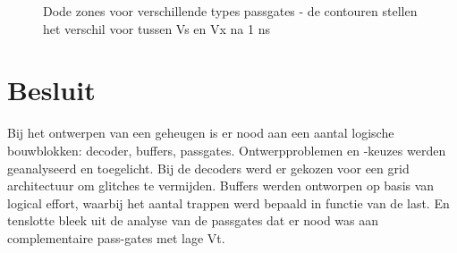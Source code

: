 \begin{figure}[!ht]
\caption[Dode zones voor verschillende types passgates]{Dode zones voor verschillende types passgates - de contouren stellen het verschil voor tussen Vs en Vx na 1 ns}
\label{fig:passgate3}
\end{figure}



\section{Besluit}
Bij het ontwerpen van een geheugen is er nood aan een aantal logische bouwblokken: decoder, buffers, passgates. Ontwerpproblemen en -keuzes werden geanalyseerd en toegelicht. Bij de decoders werd er gekozen voor een grid architectuur om glitches te vermijden. Buffers werden ontworpen op basis van logical effort, waarbij het aantal trappen werd bepaald in functie van de last. En tenslotte bleek uit de analyse van de passgates dat er nood was aan complementaire pass-gates met lage Vt.
